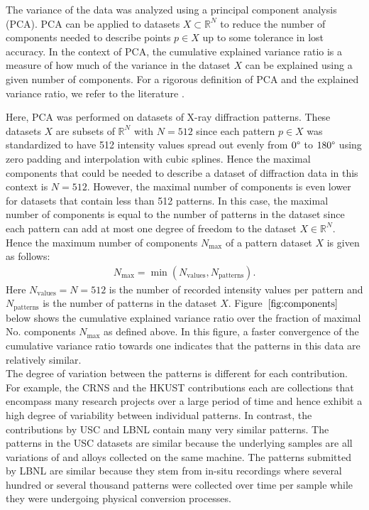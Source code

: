 The variance of the data was analyzed using a principal component analysis (PCA). PCA can be applied to datasets $X \subset \mathbb{R}^N$ to reduce the number of components needed to describe points $p \in X$ up to some tolerance in lost accuracy. In the context of PCA, the cumulative explained variance ratio is a measure of how much of the variance in the dataset $X$ can be explained using a given number of components. For a rigorous definition of PCA and the explained variance ratio, we refer to the literature \cite{Jolliffe2016}. \newline

Here, PCA was performed on datasets of X-ray diffraction patterns. These datasets $X$ are subsets of $\mathbb{R}^{N}$ with $N=512$ since each pattern $p \in X$ was standardized to have 512 intensity values spread out evenly from $0\degree$ to $180\degree$ using zero padding and interpolation with cubic splines. Hence the maximal components that could be needed to describe a dataset of diffraction data in this context is $N=512$. However, the maximal number of components is even lower for datasets that contain less than 512 patterns. In this case, the maximal number of components is equal to the number of patterns in the dataset since each pattern can add at most one degree of freedom to the dataset $X \in \mathbb{R}^N$. Hence the maximum number of components $N_{\text{max}}$ of a pattern dataset $X$ is given as follows:
\begin{align}
    N_{\text{max}} = \min(N_{\text{values}}, N_{\text{patterns}}).
      \label{eq:nmax}
\end{align}
Here $N_{\text{values}} = N =512$ is the number of recorded intensity values per pattern and $N_{\text{patterns}}$ is the number of patterns in the dataset $X$. Figure~$\eqref{fig:components}$ below shows the cumulative explained variance ratio over the fraction of maximal No. components $N_{\text{max}}$ as defined above. In this figure, a faster convergence of the cumulative variance ratio towards one indicates that the patterns in this data are relatively similar. \\

The degree of variation between the patterns is different for each contribution. For example, the CRNS and the HKUST contributions each are collections that encompass many research projects over a large period of time and hence exhibit a high degree of variability between individual patterns. In contrast, the contributions by USC and LBNL contain many very similar patterns. The patterns in the USC datasets are similar because the underlying samples are all variations of  and  alloys collected on the same machine. The patterns submitted by LBNL are similar because they stem from in-situ recordings where several hundred or several thousand patterns were collected over time per sample while they were undergoing physical conversion processes.  
\pagebreak


